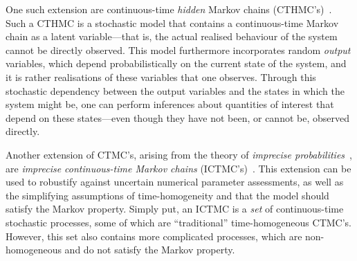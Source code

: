 \documentclass[twoside,11pt]{article}
\begin{document}
One such extension are continuous-time \emph{hidden} Markov chains (CTHMC's)~\citep{wei2002continuous}. Such a CTHMC is a stochastic model that contains a continuous-time Markov chain as a latent variable---that is, the actual realised behaviour of the system cannot be directly observed. This model furthermore incorporates random \emph{output} variables, which depend probabilistically on the current state of the system, and it is rather realisations of these variables that one observes. Through this stochastic dependency between the output variables and the states in which the system might be, one can perform inferences about quantities of interest that depend on these states---even though they have not been, or cannot be, observed directly.


Another extension of CTMC's, arising from the theory of \emph{imprecise probabilities}~\citep{Walley:1991vk}, are \emph{imprecise continuous-time Markov chains} (ICTMC's)~\citep{Skulj:2015cq, krak2016ictmc}. This extension can be used to robustify against uncertain numerical parameter assessments, as well as the simplifying assumptions of time-homogeneity and that the model should satisfy the Markov property. %
Simply put, an ICTMC is a \emph{set} of continuous-time stochastic processes, some of which are ``traditional'' time-homogeneous CTMC's. However, this set also contains more complicated processes, which are non-homogeneous and do not satisfy the Markov property.

\end{document}
